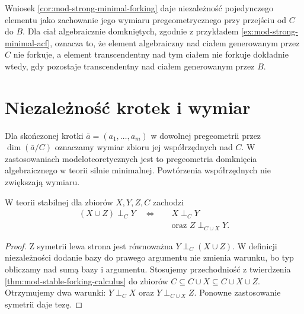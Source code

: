 Wniosek \ref{cor:mod-strong-minimal-forking}
daje niezależność pojedynczego elementu
jako zachowanie jego wymiaru pregeometrycznego
przy przejściu od $C$ do $B$.
Dla ciał algebraicznie domkniętych, zgodnie
z przykładem \ref{ex:mod-strong-minimal-acf},
oznacza to, że element algebraiczny nad
ciałem generowanym przez $C$ nie forkuje,
a element transcendentny nad tym ciałem
nie forkuje dokładnie wtedy, gdy pozostaje
transcendentny nad ciałem generowanym przez $B$.

\section{Niezależność krotek i wymiar}

Dla skończonej krotki $\bar a=(a_1,\ldots,a_m)$
w dowolnej pregeometrii przez $\dim(\bar a/C)$
oznaczamy wymiar zbioru jej współrzędnych nad $C$.
W zastosowaniach modeloteoretycznych jest to
pregeometria domknięcia algebraicznego
w teorii silnie minimalnej. Powtórzenia współrzędnych
nie zwiększają wymiaru.

\begin{lemat}
\label{lem:mod-forking-concatenation}
W teorii stabilnej dla zbiorów $X,Y,Z,C$
zachodzi
\[
\begin{aligned}
(X\cup Z)\mathrel{\perp_C}Y
\quad\Longleftrightarrow\quad&
X\mathrel{\perp_C}Y\\
&\text{oraz }Z\mathrel{\perp_{C\cup X}}Y.
\end{aligned}
\]
\end{lemat}
\begin{proof}
Z symetrii lewa strona jest równoważna
$Y\mathrel{\perp_C}(X\cup Z)$.
W definicji niezależności dodanie bazy do
prawego argumentu nie zmienia warunku,
bo typ obliczamy nad sumą bazy i argumentu.
Stosujemy przechodniość z twierdzenia
\ref{thm:mod-stable-forking-calculus}
do zbiorów
$C\subseteq C\cup X\subseteq C\cup X\cup Z$.
Otrzymujemy dwa warunki:
$Y\mathrel{\perp_C}X$ oraz
$Y\mathrel{\perp_{C\cup X}}Z$.
Ponowne zastosowanie symetrii daje tezę.
\end{proof}


